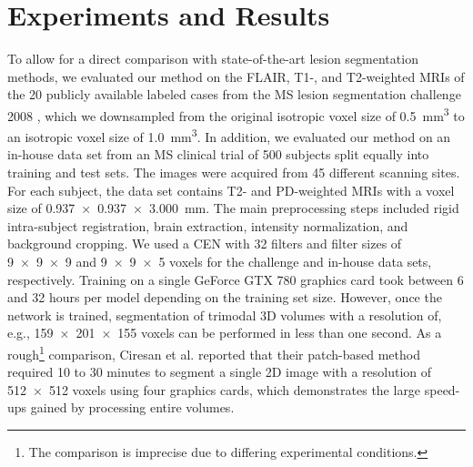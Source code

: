 \section{Experiments and Results}


To allow for a direct comparison with state-of-the-art lesion segmentation
methods, we evaluated our method on the FLAIR, T1-, and T2-weighted MRIs of the
20 publicly available labeled cases from the MS lesion segmentation challenge
2008 \cite{styner20083d}, which we downsampled from the original isotropic voxel
size of \SI{0.5}{\cubic\milli\metre} to an isotropic voxel
size of \SI{1.0}{\cubic\milli\metre}. In addition, we evaluated our method on an
in-house data set from an MS clinical trial of 500 subjects split equally into
training and test sets. The images were acquired from 45 different scanning
sites. For each subject, the data set contains T2- and PD-weighted MRIs with a
voxel size of \SI{0.937x0.937x3.000}{\milli\metre}. The main
preprocessing steps included rigid intra-subject registration, brain extraction,
intensity normalization, and background cropping.
%
%
%
We used a CEN with 32 filters and filter sizes of \num{9x9x9} and \num{9x9x5}
voxels for the challenge and in-house data sets, respectively. Training on a
single GeForce GTX 780 graphics card took between 6 and 32 hours per model
depending on the training set size. However, once the network is trained,
segmentation of trimodal 3D volumes with a resolution of, e.g.,
\num{159x201x155} voxels can be performed in less than one second. As a
rough\footnote{The comparison is imprecise due to differing experimental
conditions.} comparison, Ciresan et al. \cite{Ciresan2012} reported that their
patch-based method required 10 to 30 minutes to segment a single 2D image with a
resolution of \num{512x512} voxels using four graphics cards, which demonstrates
the large speed-ups gained by processing entire volumes.

